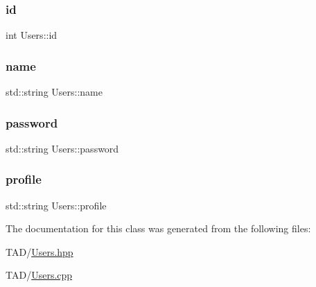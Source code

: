 \mbox{\label{class_users_a9227a9e924b546e37b745aa152d7ca23}} 
\subsubsection{\texorpdfstring{id}{id}}
{\footnotesize\ttfamily int Users\+::id\hspace{0.3cm}{\ttfamily [private]}}

\mbox{\label{class_users_abfa55c64dfc5548eb796e163633404d2}} 
\subsubsection{\texorpdfstring{name}{name}}
{\footnotesize\ttfamily std\+::string Users\+::name\hspace{0.3cm}{\ttfamily [private]}}

\mbox{\label{class_users_a7f0ae4b423977cc0168c50e0b5be93e4}} 
\subsubsection{\texorpdfstring{password}{password}}
{\footnotesize\ttfamily std\+::string Users\+::password\hspace{0.3cm}{\ttfamily [private]}}

\mbox{\label{class_users_a133880ef122466073e9c97755c809ae9}} 
\subsubsection{\texorpdfstring{profile}{profile}}
{\footnotesize\ttfamily std\+::string Users\+::profile\hspace{0.3cm}{\ttfamily [private]}}



The documentation for this class was generated from the following files\+:\begin{DoxyCompactItemize}
\item 
T\+A\+D/\hyperlink{_users_8hpp}{Users.\+hpp}\item 
T\+A\+D/\hyperlink{_users_8cpp}{Users.\+cpp}\end{DoxyCompactItemize}
